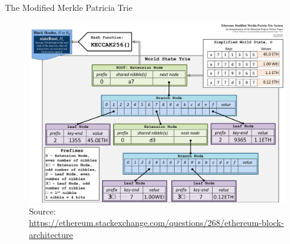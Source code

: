 \documentclass[handout]{beamer}
\begin{document}
\begin{frame}{The Modified Merkle Patricia Trie}
\vspace{1em}
\captionsetup[figure]{font=tiny,labelformat=empty}
\begin{figure}[htp]
\centering
\includegraphics[scale= 0.5]{../assets/images/modified_merkle_patricia_state_tree.jpg}
      \caption{{\tiny Source: \link \url{https://ethereum.stackexchange.com/questions/268/ethereum-block-architecture}}}\label{fig:2}
\end{figure}

		
\end{frame}
\end{document}
